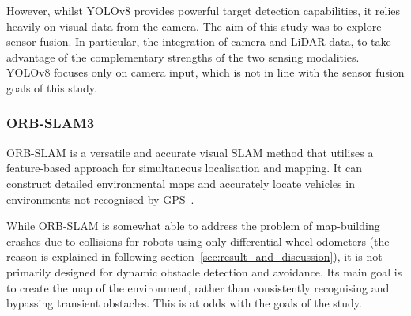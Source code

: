 However, whilst YOLOv8 provides powerful target detection capabilities, 
it relies heavily on visual data from the camera. 
The aim of this study was to explore sensor fusion. In particular, the integration of camera and LiDAR data, 
to take advantage of the complementary strengths of the two sensing modalities. 
YOLOv8 focuses only on camera input, which is not in line with the sensor fusion goals of this study.
\subsubsection{ORB-SLAM3}
\label{subsubsec:orbslam3}
ORB-SLAM is a versatile and accurate visual SLAM method 
that utilises a feature-based approach for simultaneous localisation and mapping. 
It can construct detailed environmental maps and accurately locate vehicles in environments not recognised by GPS~\cite{orbslam3}.

While ORB-SLAM is somewhat able to address the problem of map-building crashes due to collisions for robots using only differential wheel odometers
(the reason is explained in following section~\ref{sec:result_and_discussion}),
it is not primarily designed for dynamic obstacle detection and avoidance. 
Its main goal is to create the map of the environment, rather than consistently recognising and bypassing transient obstacles.
This is at odds with the goals of the study.
